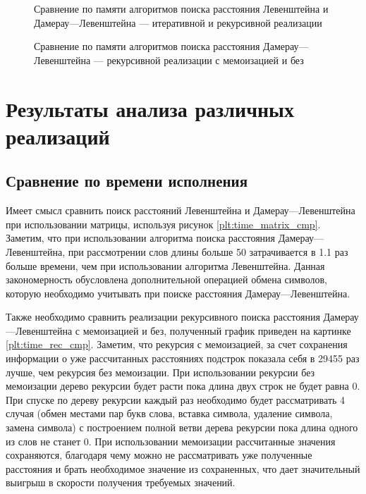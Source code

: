 \begin{figure}[H]
	\centering
	
	\caption{Сравнение по памяти алгоритмов поиска расстояния Левенштейна и Дамерау---Левенштейна --- итеративной и рекурсивной реализации}
	\label{plt:memory_mat_rec}
\end{figure}



\begin{figure}[H]
	\centering
	
	\caption{Сравнение по памяти алгоритмов поиска расстояния Дамерау---Левенштейна --- рекурсивной реализации с мемоизацией и без}
	\label{plt:memory_rec}
\end{figure}

\clearpage

\section{Результаты анализа различных реализаций}

\subsection{Сравнение по времени исполнения}
Имеет смысл сравнить поиск расстояний Левенштейна и Дамерау---Левенштейна при использовании матрицы, используя рисунок
\ref{plt:time_matrix_cmp}. Заметим, что при использовании
алгоритма поиска расстояния Дамерау---Левенштейна, при рассмотрении слов длины больше 50 затрачивается в 1.1 раз больше времени, чем 
при использовании алгоритма Левенштейна. Данная закономерность обусловлена дополнительной операцией обмена символов, которую 
необходимо учитывать при поиске расстояния Дамерау---Левенштейна.

Также необходимо сравнить реализации рекурсивного поиска расстояния Дамерау---Левенштейна с мемоизацией и без, полученный график приведен
на картинке \ref{plt:time_rec_cmp}. Заметим, что рекурсия с мемоизацией, за счет сохранения информации о уже рассчитанных расстояниях подстрок
показала себя в 29455 раз лучше, чем рекурсия без мемоизации.
При использовании рекурсии без мемоизации дерево рекурсии будет расти пока длина двух строк не будет равна 0. При спуске по дереву рекурсии каждый раз необходимо будет рассматривать 4 случая (обмен местами пар букв слова, вставка символа, удаление символа, замена символа) с построением полной ветви дерева рекурсии пока длина одного из слов не станет 0. При использовании мемоизации
рассчитанные значения сохраняются, благодаря чему можно не рассматривать уже полученные расстояния и брать необходимое значение из сохраненных, что дает значительный выигрыш в скорости получения требуемых значений.

